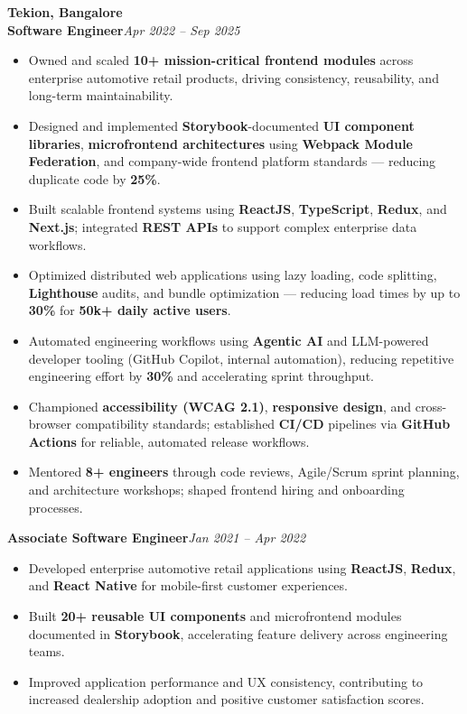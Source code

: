 \documentclass[a4paper,10pt]{article}
\newcommand{\company}[1]{\vspace{4pt}\noindent\textbf{#1}\\[-2pt]}
\newcommand{\role}[2]{\textbf{#1}\hfill \textit{#2}\\[-3pt]}
\newcommand{\rolenext}[2]{\vspace{3pt}\textbf{#1}\hfill \textit{#2}\\[-3pt]}
\begin{document}
\company{Tekion, Bangalore}
\role{Software Engineer}{Apr 2022 -- Sep 2025}
\begin{itemize}
  \item Owned and scaled \textbf{10+ mission-critical frontend modules} across enterprise automotive retail products, driving consistency, reusability, and long-term maintainability.
  \item Designed and implemented \textbf{Storybook}-documented \textbf{UI component libraries}, \textbf{microfrontend architectures} using \textbf{Webpack Module Federation}, and company-wide frontend platform standards — reducing duplicate code by \textbf{25\%}.
  \item Built scalable frontend systems using \textbf{ReactJS}, \textbf{TypeScript}, \textbf{Redux}, and \textbf{Next.js}; integrated \textbf{REST APIs} to support complex enterprise data workflows.
  \item Optimized distributed web applications using lazy loading, code splitting, \textbf{Lighthouse} audits, and bundle optimization — reducing load times by up to \textbf{30\%} for \textbf{50k+ daily active users}.
  \item Automated engineering workflows using \textbf{Agentic AI} and LLM-powered developer tooling (GitHub Copilot, internal automation), reducing repetitive engineering effort by \textbf{30\%} and accelerating sprint throughput.
  \item Championed \textbf{accessibility (WCAG 2.1)}, \textbf{responsive design}, and cross-browser compatibility standards; established \textbf{CI/CD} pipelines via \textbf{GitHub Actions} for reliable, automated release workflows.
  \item Mentored \textbf{8+ engineers} through code reviews, Agile/Scrum sprint planning, and architecture workshops; shaped frontend hiring and onboarding processes.
\end{itemize}

\rolenext{Associate Software Engineer}{Jan 2021 -- Apr 2022}
\begin{itemize}
  \item Developed enterprise automotive retail applications using \textbf{ReactJS}, \textbf{Redux}, and \textbf{React Native} for mobile-first customer experiences.
  \item Built \textbf{20+ reusable UI components} and microfrontend modules documented in \textbf{Storybook}, accelerating feature delivery across engineering teams.
  \item Improved application performance and UX consistency, contributing to increased dealership adoption and positive customer satisfaction scores.
\end{itemize}
\end{document}
